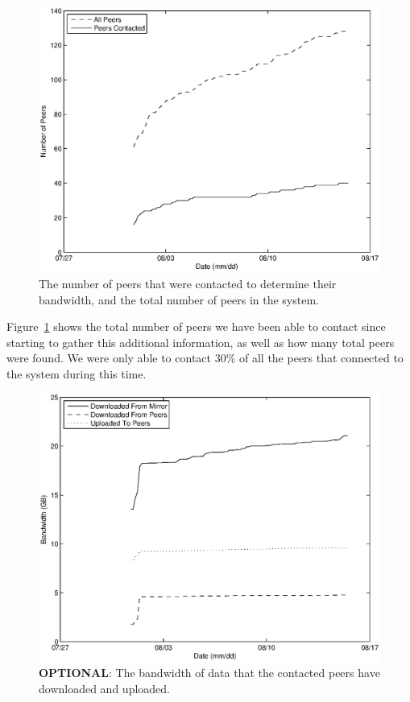 \documentclass[conference]{IEEEtran}
\begin{document}
\begin{figure}
\centering
\includegraphics[width=\columnwidth]{AptP2PDownloaded-peers.eps}
\caption{The number of peers that were contacted to determine their
bandwidth, and the total number of peers in the system.}
\label{down_peers}
\end{figure}

Figure~\ref{down_peers} shows the total number of peers we have been
able to contact since starting to gather this additional
information, as well as how many total peers were found. We were
only able to contact 30\% of all the peers that connected to the
system during this time.

\begin{figure}
\centering
\includegraphics[width=\columnwidth]{AptP2PDownloaded-bw.eps}
\caption{\textbf{OPTIONAL}: The bandwidth of data that the contacted peers have
downloaded and uploaded.}
\label{down_bw}
\end{figure}
\end{document}
